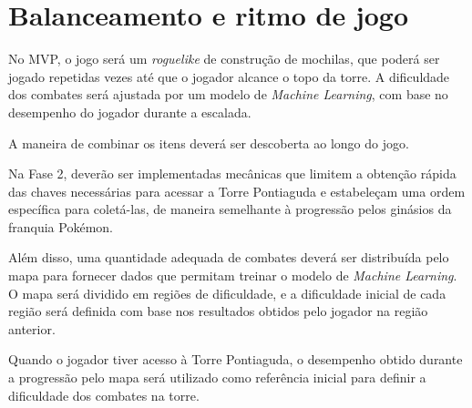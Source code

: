 \section{Balanceamento e ritmo de jogo}

No MVP, o jogo será um \textit{roguelike} de construção 
de mochilas, que poderá ser jogado repetidas vezes até 
que o jogador alcance o topo da torre. A dificuldade 
dos combates será ajustada por um modelo de 
\textit{Machine Learning}, com base no desempenho 
do jogador durante a escalada.

A maneira de combinar os itens deverá ser descoberta ao 
longo do jogo.

Na Fase 2, deverão ser implementadas mecânicas que 
limitem a obtenção rápida das chaves necessárias para 
acessar a Torre Pontiaguda e estabeleçam uma ordem 
específica para coletá-las, de maneira semelhante à 
progressão pelos ginásios da franquia Pokémon.

Além disso, uma quantidade adequada de combates deverá 
ser distribuída pelo mapa para fornecer dados que 
permitam treinar o modelo de \textit{Machine Learning}. 
O mapa será dividido em regiões de dificuldade, e a 
dificuldade inicial de cada região será definida com 
base nos resultados obtidos pelo jogador na região 
anterior.

Quando o jogador tiver acesso à Torre Pontiaguda, o 
desempenho obtido durante a progressão pelo mapa será 
utilizado como referência inicial para definir a 
dificuldade dos combates na torre.
